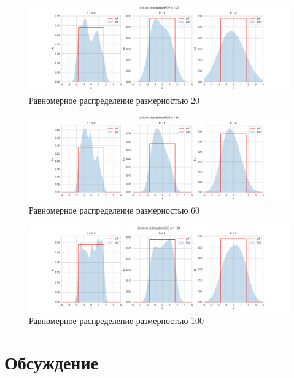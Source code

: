 \documentclass[a4paper,14pt]{article}
\begin{document}
	\begin{figure}[H]
		\centering
		\includegraphics[scale=0.35]{../image/lab4/lab4_kde_uniform_20.png}
		\caption{Равномерное распределение размерностью 20}
	\end{figure}
	
	\begin{figure}[H]
		\centering
		\includegraphics[scale=0.35]{../image/lab4/lab4_kde_uniform_60.png}
		\caption{Равномерное распределение размерностью 60}
	\end{figure}
	
	\begin{figure}[H]
		\centering
		\includegraphics[scale=0.35]{../image/lab4/lab4_kde_uniform_100.png}
		\caption{Равномерное распределение размерностью 100}
	\end{figure}
	
	\section{Обсуждение}
\end{document}
